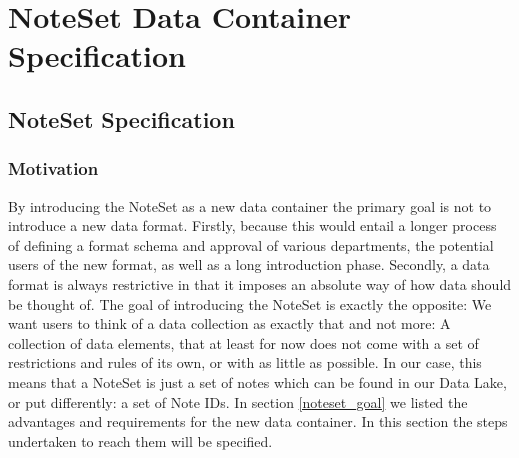 \chapter{ NoteSet Data Container Specification}
\label{chap:technicaldocu}

\section{NoteSet Specification}
\subsection{Motivation}
By introducing the NoteSet as a new data container the primary goal is not to introduce a new data format. Firstly, because this would entail a longer process of defining a format schema and approval of various departments, the potential users of the new format, as well as a long introduction phase. Secondly, a data format is always restrictive in that it imposes an absolute way of how data should be thought of. The goal of introducing the NoteSet is exactly the opposite: We want users to think of a data collection as exactly that and not more: A collection of data elements, that at least for now does not come with a set of restrictions and rules of its own, or with as little as possible. In our case, this means that a NoteSet is just a set of notes which can be found in our Data Lake, or put differently: a set of Note IDs. In section \ref{noteset_goal} we listed the advantages and requirements for the new data container. In this section the steps undertaken to reach them will be specified.
